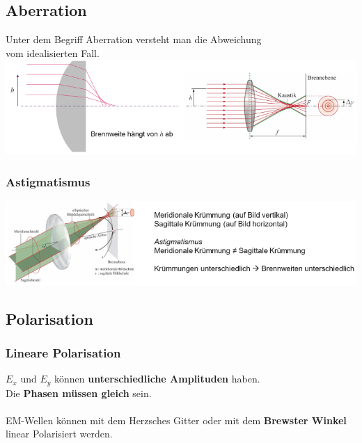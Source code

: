 \subsection{Aberration}
Unter dem Begriff Aberration versteht man die Abweichung\\
vom idealisierten Fall. \\

\includegraphics[width=0.9\linewidth]{Bilder/Wellen-Optik/Aberration}



\subsubsection{Astigmatismus}

\includegraphics[width=0.9\linewidth]{Bilder/Wellen-Optik/Astigmatismus}





\subsection{Polarisation}


\subsubsection{Lineare Polarisation}

$E_x$ und $E_y$ können \textbf{unterschiedliche Amplituden} haben. \\
Die \textbf{Phasen müssen gleich} sein.\\
\\
EM-Wellen können mit dem Herzsches Gitter oder mit dem \textbf{Brewster Winkel} linear Polarisiert werden.

